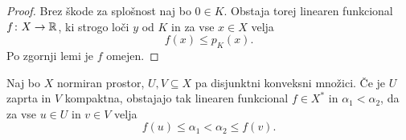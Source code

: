 \begin{proof}
Brez škode za splošnost naj bo $0 \in K$. Obstaja torej linearen
funkcional $f \colon X \to \mathbb{R}$, ki strogo loči $y$ od $K$ in za vse
$x \in X$ velja
\[
f(x) \leq p_K(x).
\]
Po zgornji lemi je $f$ omejen.
\end{proof}

\begin{izrek}
Naj bo $X$ normiran prostor, $U, V \subseteq X$ pa disjunktni
konveksni množici. Če je $U$ zaprta in $V$ kompaktna, obstajajo tak
linearen funkcional $f \in X^*$ in $\alpha_1 < \alpha_2$, da za vse
$u \in U$ in $v \in V$ velja
\[
f(u) \leq \alpha_1 < \alpha_2 \leq f(v).
\]
\end{izrek}
